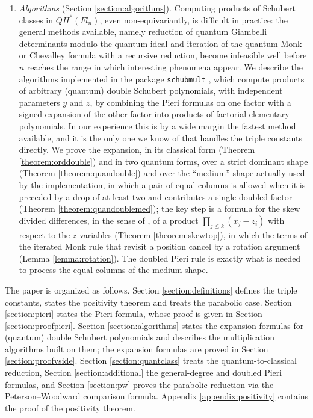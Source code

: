 \documentclass{amsart}
\theoremstyle{definition}
\theoremstyle{remark}
\numberwithin{equation}{section}
\begin{document}
\begin{enumerate}
\item \emph{Algorithms} (Section \ref{section:algorithms}). Computing products of Schubert classes in $QH^*(Fl_n)$, even non-equivariantly, is difficult in practice: the general methods available, namely reduction of quantum Giambelli determinants modulo the quantum ideal and iteration of the quantum Monk or Chevalley formula with a recursive reduction, become infeasible well before $n$ reaches the range in which interesting phenomena appear. We describe the algorithms implemented in the package \texttt{schubmult} \cite{schubmult}, which compute products of arbitrary (quantum) double Schubert polynomials, with independent parameters $y$ and $z$, by combining the Pieri formulas on one factor with a signed expansion of the other factor into products of factorial elementary polynomials. In our experience this is by a wide margin the fastest method available, and it is the only one we know of that handles the triple constants directly. We prove the expansion, in its classical form (Theorem \ref{theorem:orddouble}) and in two quantum forms, over a strict dominant shape (Theorem \ref{theorem:quandouble}) and over the ``medium'' shape actually used by the implementation, in which a pair of equal columns is allowed when it is preceded by a drop of at least two and contributes a single doubled factor (Theorem \ref{theorem:quandoublemed}); the key step is a formula for the skew divided differences, in the sense of \cite{samuelleibniz,samuelmolev}, of a product $\prod_{j\leq k}(x_j-z_i)$ with respect to the $z$-variables (Theorem \ref{theorem:skewtop}), in which the terms of the iterated Monk rule that revisit a position cancel by a rotation argument (Lemma \ref{lemma:rotation}). The doubled Pieri rule is exactly what is needed to process the equal columns of the medium shape.
\end{enumerate}

The paper is organized as follows. Section \ref{section:definitions} defines the triple constants, states the positivity theorem and treats the parabolic case. Section \ref{section:pieri} states the Pieri formula, whose proof is given in Section \ref{section:proofpieri}. Section \ref{section:algorithms} states the expansion formulas for (quantum) double Schubert polynomials and describes the multiplication algorithms built on them; the expansion formulas are proved in Section \ref{section:proofvside}. Section \ref{section:quantclass} treats the quantum-to-classical reduction, Section \ref{section:additional} the general-degree and doubled Pieri formulas, and Section \ref{section:pw} proves the parabolic reduction via the Peterson--Woodward comparison formula. Appendix \ref{appendix:positivity} contains the proof of the positivity theorem.
\end{document}
